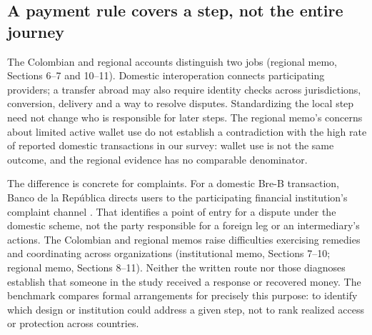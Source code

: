 \subsection{A payment rule covers a step, not the entire journey}

The Colombian and regional accounts distinguish two jobs (regional memo, Sections 6--7 and 10--11). Domestic interoperation connects participating providers; a transfer abroad may also require identity checks across jurisdictions, conversion, delivery and a way to resolve disputes. Standardizing the local step need not change who is responsible for later steps. The regional memo's concerns about limited active wallet use do not establish a contradiction with the high rate of reported domestic transactions in our survey: wallet use is not the same outcome, and the regional evidence has no comparable denominator.

The difference is concrete for complaints. For a domestic Bre-B transaction, Banco de la República directs users to the participating financial institution's complaint channel \citep{banrepfaq}. That identifies a point of entry for a dispute under the domestic scheme, not the party responsible for a foreign leg or an intermediary's actions. The Colombian and regional memos raise difficulties exercising remedies and coordinating across organizations (institutional memo, Sections 7--10; regional memo, Sections 8--11). Neither the written route nor those diagnoses establish that someone in the study received a response or recovered money. The benchmark compares formal arrangements for precisely this purpose: to identify which design or institution could address a given step, not to rank realized access or protection across countries.

